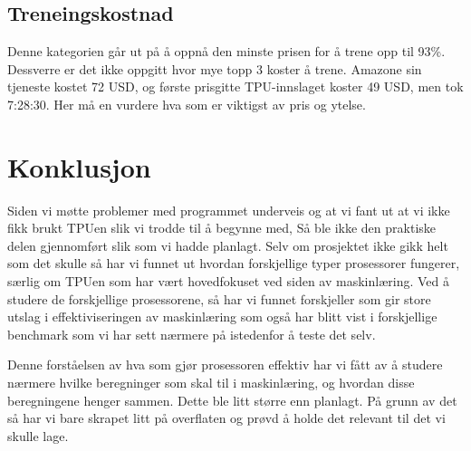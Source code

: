 \subsection{Treneingskostnad}
Denne kategorien går ut på å oppnå den minste prisen for å trene opp til 93\%. Dessverre er det ikke oppgitt hvor mye topp 3 koster å trene. Amazone sin tjeneste kostet 72 USD, og første prisgitte TPU-innslaget koster 49 USD, men tok 7:28:30. Her må en vurdere hva som er viktigst av pris og ytelse.

\newpage
\section{Konklusjon}
Siden vi møtte problemer med programmet underveis og at vi fant ut at vi ikke fikk brukt TPUen slik vi trodde til å begynne med, Så ble ikke den praktiske delen gjennomført slik som vi hadde planlagt.
Selv om prosjektet ikke gikk helt som det skulle så har vi funnet ut hvordan forskjellige typer prosessorer fungerer, særlig om TPUen som har vært hovedfokuset ved siden av maskinlæring. Ved å studere de forskjellige prosessorene, så har vi funnet forskjeller som gir store utslag i effektiviseringen av maskinlæring som også har blitt vist i forskjellige benchmark som vi har sett nærmere på istedenfor å teste det selv.

Denne forståelsen av hva som gjør prosessoren effektiv har vi fått av å studere nærmere hvilke beregninger som skal til i maskinlæring, og hvordan disse beregningene henger sammen. Dette ble litt større enn planlagt. På grunn av det så har vi bare skrapet litt på overflaten og prøvd å holde det relevant til det vi skulle lage.


\newpage
\printbibliography[title=Referanser]
